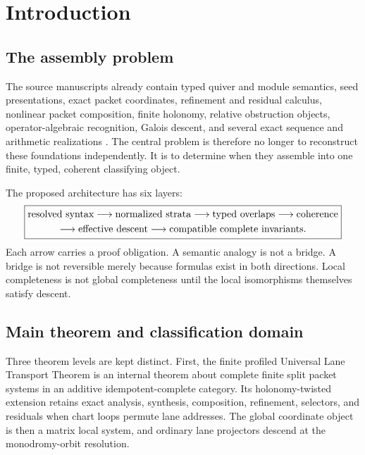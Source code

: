 \documentclass[11pt]{article}
\theoremstyle{definition}
\theoremstyle{remark}
\begin{document}
\tableofcontents
\clearpage
{}

\section{Introduction}

\subsection{The assembly problem}

The source manuscripts already contain typed quiver and module semantics, seed presentations, exact packet coordinates, refinement and residual calculus, nonlinear packet composition, finite holonomy, relative obstruction objects, operator-algebraic recognition, Galois descent, and several exact sequence and arithmetic realizations \cite{P1,RT,P3,GAL,SEQ}. The central problem is therefore no longer to reconstruct these foundations independently. It is to determine when they assemble into one finite, typed, coherent classifying object.

The proposed architecture has six layers:
\[
\boxed{
\begin{gathered}
\text{resolved syntax}\longrightarrow\text{normalized strata}
\longrightarrow\text{typed overlaps}\longrightarrow\text{coherence}\cr
\longrightarrow\text{effective descent}
\longrightarrow\text{compatible complete invariants}.
\end{gathered}}
\]
Each arrow carries a proof obligation. A semantic analogy is not a bridge. A bridge is not reversible merely because formulas exist in both directions. Local completeness is not global completeness until the local isomorphisms themselves satisfy descent.

\subsection{Main theorem and classification domain}

Three theorem levels are kept distinct. First, the finite profiled Universal Lane Transport Theorem is an internal theorem about complete finite split packet systems in an additive idempotent-complete category. Its holonomy-twisted extension retains exact analysis, synthesis, composition, refinement, selectors, and residuals when chart loops permute lane addresses. The global coordinate object is then a matrix local system, and ordinary lane projectors descend at the monodromy-orbit resolution.
\end{document}
